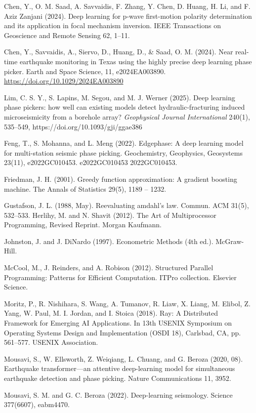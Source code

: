Chen, Y., O. M. Saad, A. Savvaidis, F. Zhang, Y. Chen, D. Huang, H. Li, and F. Aziz Zanjani (2024). Deep learning for p-wave first-motion polarity determination and its application in focal mechanism inversion. IEEE Transactions on Geoscience and Remote Sensing 62, 1–11.

Chen, Y., Savvaidis, A., Siervo, D., Huang, D., \& Saad, O. M. (2024). Near real-time earthquake monitoring in Texas using the highly precise deep learning phase picker. Earth and Space Science, 11, e2024EA003890. \url{https://doi.org/10.1029/2024EA003890}

Lim, C. S. Y., S. Lapins, M. Segou, and M. J. Werner (2025). Deep learning phase pickers: how well can existing models detect hydraulic-fracturing induced microseismicity from a borehole array? \emph{Geophysical Journal International} 240(1), 535–549, https://doi.org/10.1093/gji/ggae386

Feng, T., S. Mohanna, and L. Meng (2022). Edgephase: A deep learning model for multi-station seismic phase picking. Geochemistry, Geophysics, Geosystems 23(11), e2022GC010453. e2022GC010453 2022GC010453.

Friedman, J. H. (2001). Greedy function approximation: A gradient boosting machine. The Annals of Statistics 29(5), 1189 – 1232.

Gustafson, J. L. (1988, May). Reevaluating amdahl’s law. Commun. ACM 31(5), 532–533. Herlihy, M. and N. Shavit (2012). The Art of Multiprocessor Programming, Revised Reprint. Morgan Kaufmann.

Johnston, J. and J. DiNardo (1997). Econometric Methods (4th ed.). McGraw-Hill.

McCool, M., J. Reinders, and A. Robison (2012). Structured Parallel Programming: Patterns for Efficient Computation. ITPro collection. Elsevier Science.

Moritz, P., R. Nishihara, S. Wang, A. Tumanov, R. Liaw, X. Liang, M. Elibol, Z. Yang, W. Paul, M. I. Jordan, and I. Stoica (2018). Ray: A Distributed Framework for Emerging AI Applications. In 13th USENIX Symposium on Operating Systems Design and Implementation (OSDI 18), Carlsbad, CA, pp. 561–577. USENIX Association.

Mousavi, S., W. Ellsworth, Z. Weiqiang, L. Chuang, and G. Beroza (2020, 08). Earthquake transformer—an attentive deep-learning model for simultaneous earthquake detection and phase picking. Nature Communications 11, 3952.

Mousavi, S. M. and G. C. Beroza (2022). Deep-learning seismology. Science 377(6607), eabm4470.

